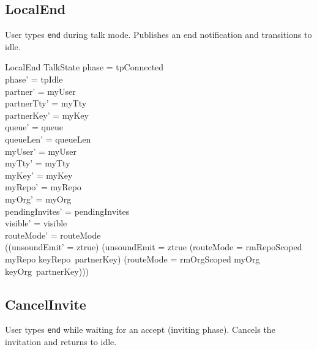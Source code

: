 \documentclass[a4paper,10pt,fleqn]{article}
\begin{document}
\subsection{LocalEnd}

User types \texttt{end} during talk mode.  Publishes an end
notification and transitions to idle.

\begin{schema}{LocalEnd}
  \Delta TalkState
\where
  phase = tpConnected \\
  phase' = tpIdle \\
  partner' = myUser \\
  partnerTty' = myTty \\
  partnerKey' = myKey \\
  queue' = queue \\
  queueLen' = queueLen \\
  myUser' = myUser \\
  myTty' = myTty \\
  myKey' = myKey \\
  myRepo' = myRepo \\
  myOrg' = myOrg \\
  pendingInvites' = pendingInvites \\
  visible' = visible \\
  routeMode' = routeMode \\
  ((unsoundEmit' = ztrue) \iff
    (unsoundEmit = ztrue \lor
      (routeMode = rmRepoScoped \land myRepo \neq keyRepo~partnerKey) \lor
      (routeMode = rmOrgScoped \land myOrg \neq keyOrg~partnerKey)))
\end{schema}

\subsection{CancelInvite}

User types \texttt{end} while waiting for an accept (inviting
phase).  Cancels the invitation and returns to idle.
\end{document}

